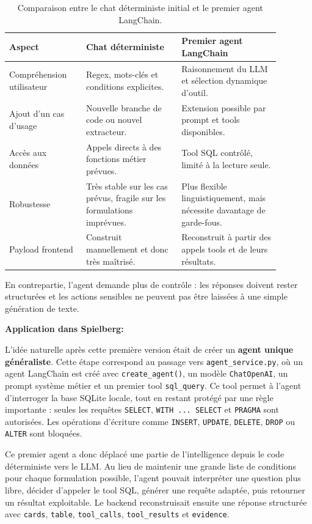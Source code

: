 \documentclass[a4paper,11pt,english,openany]{book}
\begin{document}
\begingroup
\small
\renewcommand{\arraystretch}{1.18}
\setlength{\tabcolsep}{5pt}
\begin{longtable}{|L{0.25\linewidth}|L{0.31\linewidth}|L{0.32\linewidth}|}
\caption{Comparaison entre le chat déterministe initial et le premier agent LangChain.}\\
\hline
\textbf{Aspect} & \textbf{Chat déterministe} & \textbf{Premier agent LangChain}\\
\hline
Compréhension utilisateur
& Regex, mots-clés et conditions explicites.
& Raisonnement du LLM et sélection dynamique d'outil.\\
\hline
Ajout d'un cas d'usage
& Nouvelle branche de code ou nouvel extracteur.
& Extension possible par prompt et tools disponibles.\\
\hline
Accès aux données
& Appels directs à des fonctions métier prévues.
& Tool SQL contrôlé, limité à la lecture seule.\\
\hline
Robustesse
& Très stable sur les cas prévus, fragile sur les formulations imprévues.
& Plus flexible linguistiquement, mais nécessite davantage de garde-fous.\\
\hline
Payload frontend
& Construit manuellement et donc très maîtrisé.
& Reconstruit à partir des appels tools et de leurs résultats.\\
\hline
\end{longtable}
\endgroup

En contrepartie, l'agent demande plus de contrôle : les réponses doivent rester structurées et les actions sensibles ne peuvent pas être laissées à une simple génération de texte.

\textbf{Application dans Spielberg:}

L'idée naturelle après cette première version était de créer un \textbf{agent unique généraliste}. Cette étape correspond au passage vers \texttt{agent\_service.py}, où un agent LangChain est créé avec \texttt{create\_agent()}, un modèle \texttt{ChatOpenAI}, un prompt système métier et un premier tool \texttt{sql\_query}. Ce tool permet à l'agent d'interroger la base SQLite locale, tout en restant protégé par une règle importante : seules les requêtes \texttt{SELECT}, \texttt{WITH ... SELECT} et \texttt{PRAGMA} sont autorisées. Les opérations d'écriture comme \texttt{INSERT}, \texttt{UPDATE}, \texttt{DELETE}, \texttt{DROP} ou \texttt{ALTER} sont bloquées.

Ce premier agent a donc déplacé une partie de l'intelligence depuis le code déterministe vers le LLM. Au lieu de maintenir une grande liste de conditions pour chaque formulation possible, l'agent pouvait interpréter une question plus libre, décider d'appeler le tool SQL, générer une requête adaptée, puis retourner un résultat exploitable. Le backend reconstruisait ensuite une réponse structurée avec \texttt{cards}, \texttt{table}, \texttt{tool\_calls}, \texttt{tool\_results} et \texttt{evidence}.
\end{document}
